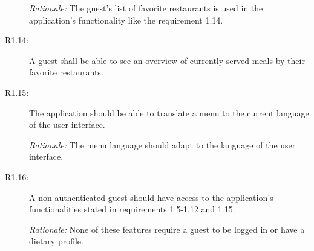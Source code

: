 \begin{description}
    \emph{Rationale:} The guest's list of favorite restaurants is used in the application's functionality like the requirement 1.14.
    \item [R1.14:] A guest shall be able to see an overview of currently served meals by their favorite restaurants.
    \item [R1.15:] The application should be able to translate a menu to the current language of the user interface.

    \emph{Rationale:} The menu language should adapt to the language of the user interface.
    \item [R1.16:] A non-authenticated guest should have access to the application's functionalities stated in requirements 1.5-1.12 and 1.15.  
    
    \emph{Rationale:} None of these features require a guest to be logged in or have a dietary profile.
\end{description}

